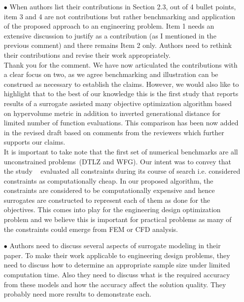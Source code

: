 \documentclass[onecolumn,10pt]{asme2ej}
\begin{document}
\begin{itemize}
\item[$\bullet$]When authors list their contributions in Section 2.3, out of 4 bullet points, item 3 and 4 are not contributions but rather benchmarking and application of the proposed approach to an engineering problem. Item 1 needs an extensive discussion to justify as a contribution (as I mentioned in the previous comment) and there remains Item 2 only. Authors need to rethink their contributions and revise their work appropriately. \\

{\color{blue}
Thank you for the comment. We have now articulated the contributions with a clear focus on two, as we agree benchmarking and illustration can be construed as necessary to establish the claims. However, we would also like to highlight that to the best of our knowledge this is the first study that reports results of a surrogate assisted many objective optimization algorithm based on hypervolume metric in addition to inverted generational distance for limited number of function evaluations. This comparison has been now added in the revised draft based on comments from the reviewers which further supports our claims. \\

It is important to take note that the first set of numerical benchmarks are all unconstrained problems~(DTLZ and WFG).  Our intent was to convey that the study ~\cite{KHTchugh2016const} evaluated all constraints during its course of search i.e. considered constraints as computationally cheap. In our proposed algorithm, the constraints are considered to be computationally expensive and hence surrogates are constructed to represent each of them as done for the objectives. This comes into play for the engineering design optimization problem and we believe this is important for practical problems as many of the constraints could emerge from FEM or CFD analysis. 
}\\



\item[$\bullet$] Authors need to discuss several aspects of surrogate modeling in their paper. To make their work applicable to engineering design problems, they need to discuss how to determine an appropriate sample size under limited computation time. Also they need to discuss what is the required accuracy from these models and how the accuracy affect the solution quality. They probably need more results to demonstrate each. \\


\end{itemize}
\end{document}
